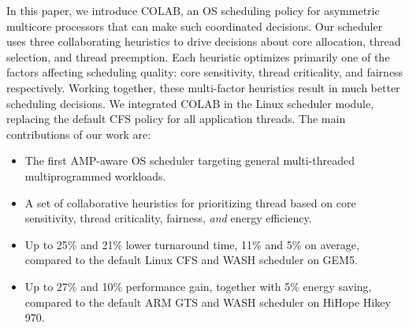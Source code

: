 In this paper, we introduce COLAB, an OS scheduling policy for asymmetric multicore processors that can make such coordinated decisions. Our scheduler uses three collaborating heuristics to drive decisions about core allocation, thread selection, and thread preemption. Each heuristic optimizes primarily one of the factors affecting scheduling quality: core sensitivity, thread criticality, and fairness respectively. Working together, these multi-factor heuristics result in much better scheduling decisions.
We integrated COLAB in the Linux scheduler module, replacing the default CFS policy for all application threads.
The main contributions of our work are:
\begin{itemize}
\item  The first AMP-aware OS scheduler targeting general multi-threaded multiprogrammed workloads.
\item A set of collaborative heuristics for prioritizing thread based on core sensitivity, thread criticality, fairness, \emph{and} energy efficiency.
\item Up to 25\% and 21\% lower turnaround time, 11\% and 5\% on average, compared to the default Linux CFS and WASH scheduler on GEM5. 
\item Up to 27\% and 10\% performance gain, together with 5\% energy saving, compared to the default ARM GTS and WASH scheduler on HiHope Hikey 970.
\end{itemize}

